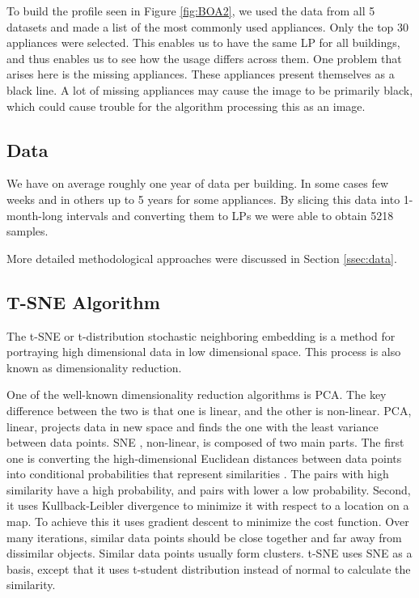 To build the profile seen in Figure \ref{fig:BOA2}, we used the data from all 5 datasets and made a list of the most commonly used appliances.
Only the top 30 appliances were selected.
This enables us to have the same LP for all buildings, and thus enables us to see how the usage differs across them.
One problem that arises here is the missing appliances.
These appliances present themselves as a black line.
A lot of missing appliances may cause the image to be primarily black,
which could cause trouble for the algorithm processing this as an image.

\subsection{Data}

We have on average roughly one year of data per building. 
In some cases few weeks and in others up to 5 years for some appliances.
By slicing this data into 1-month-long intervals and converting them to LPs we were able to obtain 5218 samples.

More detailed methodological approaches were discussed in Section \ref{ssec:data}.

\subsection{T-SNE Algorithm}

The t-SNE \cite{tsne2} or t-distribution stochastic neighboring embedding is a method for portraying high dimensional 
data in low dimensional space. This process is also known as dimensionality reduction.

One of the well-known dimensionality reduction algorithms is PCA.
The key difference between the two is that one is linear, and the other is non-linear.
PCA, linear, projects data in new space and finds the one with the least variance between data points.
SNE \cite{sne1}, non-linear, is composed of two main parts. The first one is 
converting the high-dimensional Euclidean distances between data points into conditional probabilities that represent similarities \cite{sne1}.
The pairs with high similarity have a high probability, and pairs with lower a low probability.
Second, it uses Kullback-Leibler divergence to minimize it with respect to a location on a map.
To achieve this it uses gradient descent to minimize the cost function.
Over many iterations, similar data points should be close together and far away from dissimilar objects.
Similar data points usually form clusters. 
t-SNE uses SNE as a basis, except that it uses t-student distribution instead of normal to calculate the similarity.

